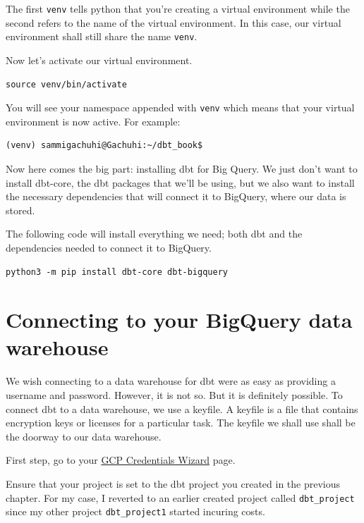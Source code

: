 \documentclass[
]{book}
\begin{document}
The first \texttt{venv} tells python that you're creating a virtual environment while the second refers to the name of the virtual environment. In this case, our virtual environment shall still share the name \texttt{venv}.

Now let's activate our virtual environment.

\begin{verbatim}
source venv/bin/activate
\end{verbatim}

You will see your namespace appended with \texttt{venv} which means that your virtual environment is now active. For example:

\begin{verbatim}
(venv) sammigachuhi@Gachuhi:~/dbt_book$ 
\end{verbatim}

Now here comes the big part: installing dbt for Big Query. We just don't want to install dbt-core, the dbt packages that we'll be using, but we also want to install the necessary dependencies that will connect it to BigQuery, where our data is stored.

The following code will install everything we need; both dbt and the dependencies needed to connect it to BigQuery.

\begin{verbatim}
python3 -m pip install dbt-core dbt-bigquery
\end{verbatim}

\hypertarget{connecting-to-your-bigquery-data-warehouse}{%
\section{Connecting to your BigQuery data warehouse}\label{connecting-to-your-bigquery-data-warehouse}}

We wish connecting to a data warehouse for dbt were as easy as providing a username and password. However, it is not so. But it is definitely possible. To connect dbt to a data warehouse, we use a keyfile. A keyfile is a file that contains encryption keys or licenses for a particular task. The keyfile we shall use shall be the doorway to our data warehouse.

First step, go to your \href{https://console.cloud.google.com/apis/credentials/wizard}{GCP Credentials Wizard} page.

Ensure that your project is set to the dbt project you created in the previous chapter. For my case, I reverted to an earlier created project called \texttt{dbt\_project} since my other project \texttt{dbt\_project1} started incuring costs.
\end{document}
